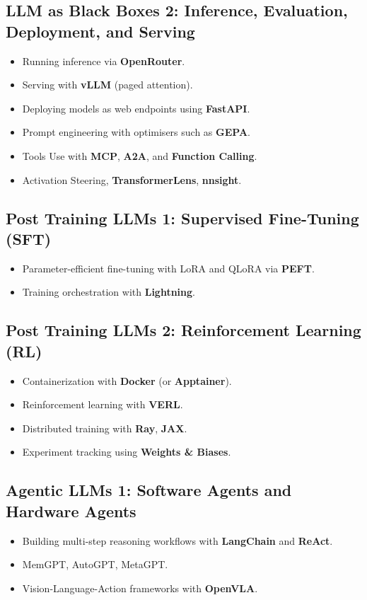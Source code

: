 \documentclass[12pt]{article}
\begin{document}
\subsection{LLM as Black Boxes 2: Inference, Evaluation, Deployment, and Serving}
\begin{itemize}
    \item Running inference via \textbf{OpenRouter}.
    \item Serving with \textbf{vLLM} (paged attention).  %
    \item Deploying models as web endpoints using \textbf{FastAPI}.
    \item Prompt engineering with optimisers such as \textbf{GEPA}.
    \item Tools Use with \textbf{MCP}, \textbf{A2A}, and \textbf{Function Calling}.
    \item Activation Steering,  \textbf{TransformerLens}, \textbf{nnsight}.
\end{itemize}

\subsection{Post Training LLMs 1: Supervised Fine-Tuning (SFT)}
\begin{itemize}
    \item Parameter-efficient fine-tuning with LoRA and QLoRA via \textbf{PEFT}.
    \item Training orchestration with \textbf{Lightning}.
\end{itemize}

\subsection{Post Training LLMs 2: Reinforcement Learning (RL)}
\begin{itemize}
    \item Containerization with \textbf{Docker} (or \textbf{Apptainer}).
    \item Reinforcement learning with \textbf{VERL}.
    \item Distributed training with \textbf{Ray}, \textbf{JAX}.
    \item Experiment tracking using \textbf{Weights \& Biases}.
\end{itemize}

\subsection{Agentic LLMs 1: Software Agents and Hardware Agents}
\begin{itemize}
    \item Building multi-step reasoning workflows with \textbf{LangChain} and \textbf{ReAct}.
    \item MemGPT, AutoGPT, MetaGPT. 
    \item Vision-Language-Action frameworks with \textbf{OpenVLA}.
\end{itemize}
\end{document}
